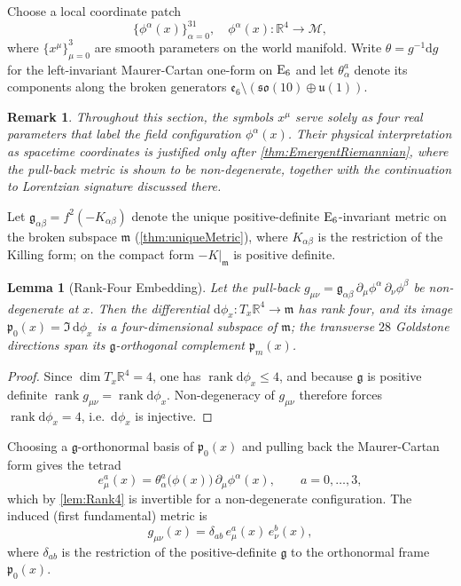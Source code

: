 \documentclass[pdflatex,sn-mathphys-num]{sn-jnl}
\theoremstyle{thmstyleone}
\newtheorem{lemma}[lemma]{Lemma}
\theoremstyle{thmstylethree}%
\theoremstyle{thmstyletwo}%
\newtheorem{remark}[remark]{Remark}
\begin{document}
Choose a local coordinate patch
$$
  \{\phi^{\alpha} (x)\}_{\alpha=0}^{31},\quad
  \phi^{\alpha}(x):\mathbb R^{4}\to\mathcal M,
$$
where $\{x^{\mu}\}_{\mu=0}^3$ are smooth parameters on the world
manifold.  Write $\theta=g^{-1}\mathrm d g$ for the left-invariant
Maurer-Cartan one-form on $\mathrm{E}_{6}$ and let $\theta^{ a}_{\alpha}$ denote its components along the broken generators $\mathfrak e_{6}\setminus(\mathfrak{so}(10)\oplus\mathfrak u(1))$.

\begin{remark}
Throughout this section, the symbols $x^{\mu}$ serve solely as four real parameters that label the field configuration $\phi^{\alpha}(x)$. Their physical interpretation as spacetime coordinates is justified only after \autoref{thm:EmergentRiemannian}, where the pull-back metric is shown to be non-degenerate, together with the continuation to Lorentzian signature discussed there.
\end{remark}

Let $\mathfrak g_{\alpha\beta}=f^{2}(-K_{\alpha\beta})$ denote the unique
positive-definite $\mathrm{E}_{6}$-invariant metric on the broken subspace $\mathfrak m$
(\autoref{thm:uniqueMetric}), where $K_{\alpha\beta}$ is the restriction of the
Killing form; on the compact form $-K|_{\mathfrak m}$ is positive definite.

\begin{lemma}[Rank-Four Embedding]\label{lem:Rank4}
Let the pull-back
$g_{\mu\nu}=\mathfrak g_{\alpha\beta}\,\partial_\mu\phi^{\alpha}\,\partial_\nu\phi^{\beta}$
be non-degenerate at $x$. Then the differential
$\mathrm d\phi_{x}:T_{x}\mathbb R^{4}\to\mathfrak m$ has rank four, and its
image $\mathfrak p_{0}(x)=\Im\,\mathrm d\phi_{x}$ is a four-dimensional
subspace of $\mathfrak m$; the transverse $28$ Goldstone directions span its
$\mathfrak g$-orthogonal complement $\mathfrak p_{m}(x)$.
\end{lemma}

\begin{proof}
Since $\dim T_{x}\mathbb R^{4}=4$, one has
$\operatorname{rank}\mathrm d\phi_{x}\le4$, and because $\mathfrak g$ is
positive definite $\operatorname{rank} g_{\mu\nu}=\operatorname{rank}\mathrm
d\phi_{x}$. Non-degeneracy of $g_{\mu\nu}$ therefore forces
$\operatorname{rank}\mathrm d\phi_{x}=4$, i.e.\ $\mathrm d\phi_{x}$ is injective.
\end{proof}

Choosing a $\mathfrak g$-orthonormal basis of $\mathfrak p_{0}(x)$ and pulling
back the Maurer-Cartan form gives the tetrad
\begin{equation}\label{eq:eDef}
  e_\mu^{ a}(x)=
  \theta^{ a}_{\alpha}\bigl(\phi(x)\bigr)\,
  \partial_\mu\phi^{ \alpha}(x),
  \qquad a=0,\dots,3,
\end{equation}
which by \autoref{lem:Rank4} is invertible for a non-degenerate configuration.
The induced (first fundamental) metric is
\begin{equation}\label{eq:InducedMetric}
  g_{\mu\nu}(x)
  =\delta_{ab}\,e_\mu^{ a}(x)\,e_\nu^{ b}(x),
\end{equation}
where $\delta_{ab}$ is the restriction of the positive-definite $\mathfrak g$ to
the orthonormal frame $\mathfrak p_{0}(x)$.
\end{document}
